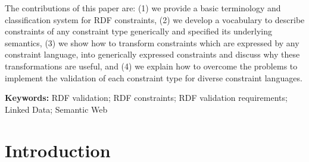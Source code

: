 \documentclass[a4paper,fontsize=11pt]{scrartcl}
\begin{document}
The contributions of this paper are:
(1) we provide a basic terminology and classification system for RDF constraints,
(2) we develop a vocabulary to describe constraints of any constraint type generically and specified its underlying semantics,
(3) we show how to transform constraints which are expressed by any constraint language, into generically expressed constraints and discuss why these transformations are useful, and
(4) we explain how to overcome the problems to implement the validation of each constraint type for diverse constraint languages.

\hspace{-1.4em}
\textbf{Keywords:}
RDF validation; RDF constraints; RDF validation requirements; Linked Data; Semantic Web

\section{Introduction}
\end{document}
